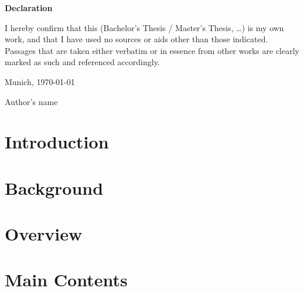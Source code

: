 \documentclass[thesis]{plai}
\begin{document}
\cleardoublepage

\vspace*{0.55\textheight}
\noindent
\begin{center}
    {\large\textbf{Declaration}}
\end{center}

\begin{flushleft}
    I hereby confirm that this (Bachelor's Thesis / Master's Thesis, \ldots) is my own work, and that I have used no sources or aids other than those indicated. Passages that are taken either verbatim or in essence from other works are clearly marked as such and referenced accordingly.

    \makeatother

    \vspace{15mm}
    \noindent

    Munich, \today{}

    Author's name
\end{flushleft}

\cleardoublepage





\tableofcontents

\cleardoublepage
{}
\setcounter{page}{1}

\chapter{Introduction}
\label{chapter:introduction}



\chapter{Background}
\label{chapter:background}



\chapter{Overview}
\label{chapter:overview}



\chapter{Main Contents}
\label{chapter:content1}
\end{document}
